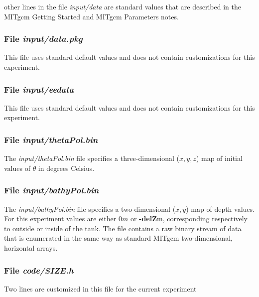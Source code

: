 \noindent other lines in the file {\it input/data} are standard values
that are described in the MITgcm Getting Started and MITgcm Parameters
notes.

\begin{small}

\end{small}

\subsubsection{File {\it input/data.pkg}}
\label{www:tutorials}

This file uses standard default values and does not contain
customizations for this experiment.

\subsubsection{File {\it input/eedata}}
\label{www:tutorials}

This file uses standard default values and does not contain
customizations for this experiment.

\subsubsection{File {\it input/thetaPol.bin}}
\label{www:tutorials}

The {\it input/thetaPol.bin} file specifies a three-dimensional ($x,y,z$) 
map of initial values of $\theta$ in degrees Celsius.

\subsubsection{File {\it input/bathyPol.bin}}
\label{www:tutorials}


The {\it input/bathyPol.bin} file specifies a two-dimensional ($x,y$) 
map of depth values. For this experiment values are either
$0m$ or {\bf -delZ}m, corresponding respectively to outside or inside of
the tank. The file contains a raw binary stream of data that is enumerated
in the same way as standard MITgcm two-dimensional, horizontal arrays.

\subsubsection{File {\it code/SIZE.h}}
\label{www:tutorials}

Two lines are customized in this file for the current experiment

